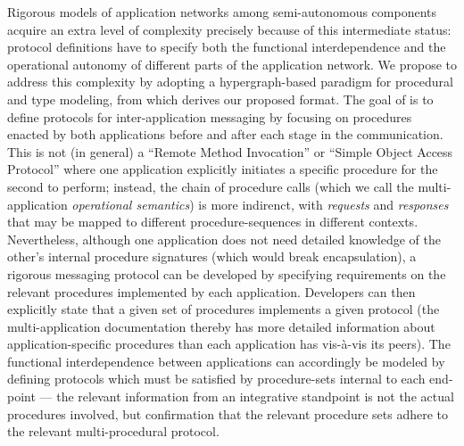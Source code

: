 \documentclass[11pt,letterpaper]{article}
\newcommand{\visavis}{vis-\`a-vis}
\newcommand{\ATextCClr}[1]{\textcolor{atcColor}{\textbf{#1}}}
\newcommand{\HMCL}{{\resizebox{!}{7.5pt}{\ATextCClr{HMCL}}}}
\newcommand{\p}[1]{

\vspace{1em}#1}
\newcommand{\q}[1]{{\fontfamily{qcr}\selectfont ``}#1{\fontfamily{qcr}\selectfont ''}}
\begin{document}
{\p{Rigorous models of application networks among semi-autonomous 
components acquire an extra level of complexity precisely 
because of this intermediate status: protocol definitions 
have to specify both the functional interdependence 
and the operational autonomy of different parts of 
the application network.  We propose to 
address this complexity by adopting a hypergraph-based 
paradigm for procedural and type modeling, from 
which derives our proposed \HMCL{} format.  
The goal of \HMCL{} is to define protocols for 
inter-application messaging by focusing on 
procedures enacted by both applications before and 
after each stage in the communication.  This 
is not (in general) a \q{Remote Method Invocation} 
or \q{Simple Object Access Protocol} where one 
application explicitly initiates a specific procedure 
for the second to perform; instead, the chain of 
procedure calls (which we call the multi-application
\textit{operational semantics}) is more indirenct, 
with \textit{requests} and \textit{responses} that 
may be mapped to different procedure-sequences in 
different contexts.  Nevertheless, although 
one application does not need detailed 
knowledge of the other's internal procedure 
signatures (which would break encapsulation), 
a rigorous messaging protocol can be developed 
by specifying requirements on the relevant 
procedures implemented by each application.  
Developers can then explicitly state that 
a given set of procedures implements a given 
\HMCL{} protocol (the multi-application documentation 
thereby has more detailed information about 
application-specific procedures than each 
application has \visavis{} its peers).  The 
functional interdependence between applications can 
accordingly be modeled by defining protocols which 
must be satisfied by procedure-sets internal 
to each end-point --- the relevant information 
from an integrative standpoint is not the 
actual procedures involved, but confirmation 
that the relevant procedure sets adhere 
to the relevant multi-procedural protocol.}

}
\end{document}
